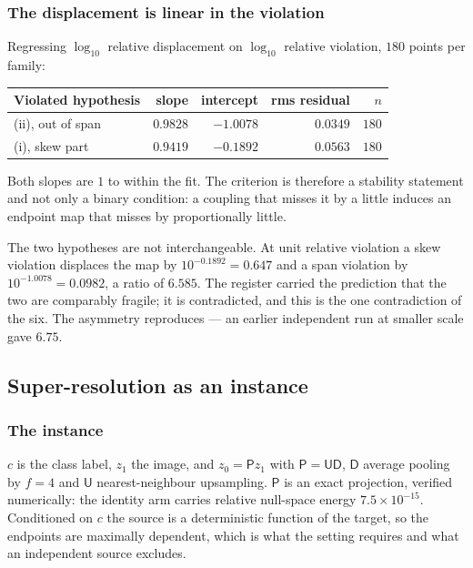 \documentclass[11pt]{article}
\begin{document}
\subsubsection*{The displacement is linear in the violation}

Regressing $\log_{10}$ relative displacement on $\log_{10}$ relative violation, $180$ points per
family:

\begin{center}
\begin{tabular}{@{}lrrrr@{}}
\toprule
Violated hypothesis & slope & intercept & rms residual & $n$\\
\midrule
(ii), out of span & $0.9828$ & $-1.0078$ & $0.0349$ & $180$\\
(i), skew part & $0.9419$ & $-0.1892$ & $0.0563$ & $180$\\
\bottomrule
\end{tabular}
\end{center}

Both slopes are $1$ to within the fit. The criterion is therefore a stability statement and not
only a binary condition: a coupling that misses it by a little induces an endpoint map that
misses by proportionally little.

The two hypotheses are not interchangeable. At unit relative violation a skew violation displaces
the map by $10^{-0.1892}=0.647$ and a span violation by $10^{-1.0078}=0.0982$, a ratio of
$6.585$. The register carried the prediction that the two are comparably fragile; it is
contradicted, and this is the one contradiction of the six. The asymmetry reproduces --- an
earlier independent run at smaller scale gave $6.75$.

\subsection{Super-resolution as an instance}
\label{sec:srscale}

\subsubsection*{The instance}

$c$ is the class label, $z_1$ the image, and $z_0=\mathsf P z_1$ with $\mathsf P=\mathsf{UD}$,
$\mathsf D$ average pooling by $f=4$ and $\mathsf U$ nearest-neighbour upsampling. $\mathsf P$ is
an exact projection, verified numerically: the identity arm carries relative null-space energy
$7.5\times10^{-15}$. Conditioned on $c$ the source is a deterministic function of the target, so
the endpoints are maximally dependent, which is what the setting requires and what an independent
source excludes.
\end{document}
